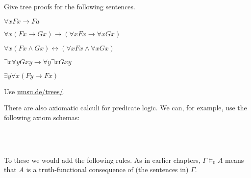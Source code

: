 \begin{exercise}
  Give tree proofs for the following sentences.
  \begin{exlist}
  \item $\forall x Fx \to Fa$
  \item $\forall x (Fx \to Gx) \to (\forall x Fx \to \forall x Gx)$
  \item $\forall x (Fx \land Gx) \leftrightarrow (\forall x Fx \land \forall x Gx)$
  \item $\exists x\forall y Gxy \to \forall y \exists x Gxy$
  \item $\exists y \forall x(Fy \to Fx)$
  \end{exlist}
\end{exercise}
\begin{solution}
  Use \href{https://www.umsu.de/trees/}{umsu.de/trees/}.
\end{solution}

There are also axiomatic calculi for predicate logic. We can, for example, use
the following axiom schemas:
%
\begin{principles}
  \\
  \\
\end{principles}
%
To these we would add the following rules. As in earlier chapters, $\Gamma \models_{0} A$ means that $A$ is a truth-functional consequence of (the sentences in) $\Gamma$.
\begin{principles}
  \\
\end{principles}


